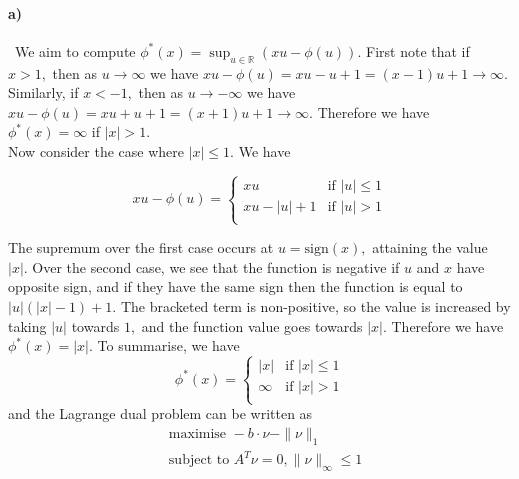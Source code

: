 \documentclass[a4paper,12pt]{article}
\begin{document}
\paragraph{a)}
\
We aim to compute $\phi^*(x) = \sup_{u\in\mathbb{R}}( xu - \phi(u)).$ First note that if $x>1,$ then as $u\to\infty$ we have $xu - \phi(u) = xu-u+1 = (x-1)u+1 \to\infty.$ Similarly, if $x<-1,$ then as $u\to-\infty$ we have $xu - \phi(u) = xu+u+1 = (x+1)u+1 \to \infty.$ Therefore we have $\phi^*(x) = \infty$ if $|x|>1.$  \\
\newline
Now consider the case where $|x|\leq 1.$ We have 

\[
  xu - \phi(u) =
  \begin{cases}
                                   xu & \text{if }|u|\leq 1  \\
                                   xu - |u| +1 & \text{if } |u|>1 \\
  \end{cases}
\]

The supremum over the first case occurs at $ u = \text{sign}(x),$ attaining the value $|x|.$ Over the second case, we see that the function is negative if $u$ and $x$ have opposite sign, and if they have the same sign then the function is equal to $|u|(|x|-1) +1.$ The bracketed term is non-positive, so the value is increased by taking $|u|$ towards $1,$ and the function value goes towards $|x|.$ Therefore we have $\phi^*(x) = |x|.$ To summarise, we have 
\[
  \phi^*(x) =
  \begin{cases}
                                   |x| & \text{if }|x|\leq 1  \\
                                   \infty & \text{if } |x|>1 \\
  \end{cases}
\]
and the Lagrange dual problem can be written as 
\begin{align*}
 &\text{maximise } -b\cdot \nu -\|\nu\|_1 \\
 &\text{subject to } A^T\nu = 0, \|\nu\|_{\infty} \leq 1
\end{align*}
\end{document}
